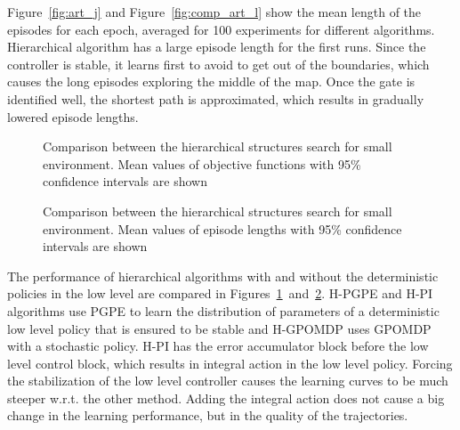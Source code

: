 Figure~\ref{fig:art_j} and Figure~\ref{fig:comp_art_l} show the mean length of the episodes for each epoch, averaged for 100 experiments for different algorithms. Hierarchical algorithm has a large episode length for the first runs. Since the controller is stable, it learns first to avoid to get out of the boundaries, which causes the long episodes exploring the middle of the map. Once the gate is identified well, the shortest path is approximated, which results in gradually lowered episode lengths. 

\begin{figure}[t!]
	\centering
    \setlength\figureheight{6cm}  
	\setlength\figurewidth{\textwidth}
	
    \caption[J comparison, hierarchical algorithms, small environment]{Comparison between the hierarchical structures search for small environment. Mean values of objective functions with 95\% confidence intervals are shown}
    \label{fig:hier_J}
\end{figure}
\begin{figure}[t!]
	\centering
    \setlength\figureheight{6cm}  
	\setlength\figurewidth{\textwidth}
	
    \caption[Episode length comparison, hierarchical algorithms, small environment]{Comparison between the hierarchical structures search for small environment. Mean values of episode lengths with 95\% confidence intervals are shown}
    \label{fig:hier_L}
\end{figure}

\clearpage


\clearpage

The performance of hierarchical algorithms with and without the deterministic policies in the low level are compared in Figures~\ref{fig:hier_J}~and~\ref{fig:hier_L}. H-PGPE and H-PI algorithms use PGPE to learn the distribution of parameters of a deterministic low level policy that is ensured to be stable and H-GPOMDP uses GPOMDP with a stochastic policy. H-PI has the error accumulator block before the low level control block, which results in integral action in the low level policy. Forcing the stabilization of the low level controller causes the learning curves to be much steeper w.r.t. the other method. Adding the integral action does not cause a big change in the learning performance, but in the quality of the trajectories.



